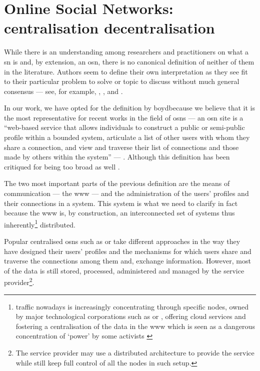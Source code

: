 \section{Online Social Networks: centralisation \vs decentralisation}
    \label{section:thesis:osns-centralisation-vs-decentralisation}
While there is an understanding among researchers and practitioners on what a \ac{sn} 
is and, by extension, an \ac{osn}, there is no canonical definition of neither of 
them in the literature. Authors seem to define their own interpretation as they 
see fit to their particular problem to solve or topic to discuss without much general 
consensus --- see, for example, \cite{AdamicA05}, \cite{DwyerHP07}, \cite{SchneiderFKW09} 
and \cite{RichterRB11}.

In our work, we have opted for the definition by boyd\etal because we believe that 
it is the most representative for recent works in the field of \acp{osn} --- an 
\ac{osn} site is a ``web-based service that allows individuals to construct a public 
or semi-public profile within a bounded system, articulate a list of other users 
with whom they share a connection, and view and traverse their list of connections 
and those made by others within the system'' --- \cite{boydE07}. Although this definition 
has been critiqued for being too broad as well \cite{Beer08}.

The two most important parts of the previous definition are the means of communication 
--- the \ac{www} --- and the administration of the users' profiles and their connections 
in a system. This system is what we need to clarify in fact because the \ac{www} 
is, by construction, an interconnected set of systems thus inherently\footnote{
\Internet traffic nowadays is increasingly concentrating through specific nodes, 
owned by major technological corporations such as \Amazon or \Google, offering cloud 
services and fostering a centralisation of the data in the \ac{www} which is seen 
as a dangerous concentration of `power' by some activists \cite{Bolychevsky13}} 
distributed.

Popular centralised \acp{osn} such as \Facebook or \Twitter take different approaches 
in the way they have designed their users' profiles and the mechanisms for which 
users share and traverse the connections among them and, exchange information. However, 
most of the data is still stored, processed, administered and managed by the service 
provider\footnote{The service provider may use a distributed architecture to provide 
the service while still keep full control of all the nodes in such setup.}.

